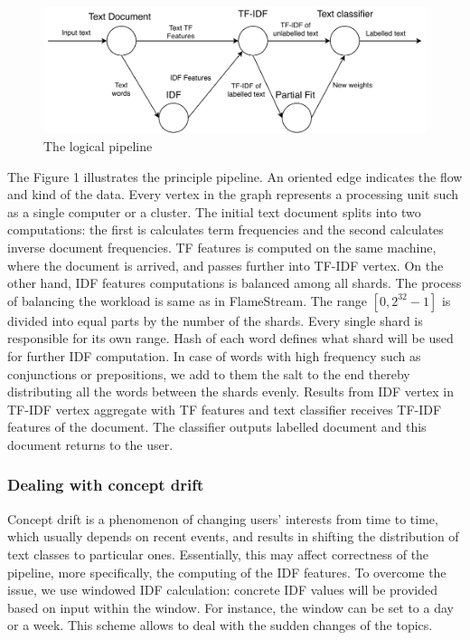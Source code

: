 \begin{figure}[htbp]
  \centering
  \includegraphics[scale=0.45]{pics/logical-graph}
  \caption{The logical pipeline}
  \label {logical graph}
\end{figure}

The Figure 1 illustrates the principle pipeline. An oriented edge indicates the flow and kind of the data. Every vertex in the graph represents a processing unit such as a single computer or a cluster. The initial text document splits into two computations: the first is calculates term frequencies and the second calculates inverse document frequencies. TF features is computed on the same machine, where the document is arrived, and passes further into TF-IDF vertex. On the other hand, IDF features computations is balanced among all shards. The process of balancing the workload is same as in FlameStream. The range $[0, 2^{32} - 1]$ is divided into equal parts by the number of the shards. Every single shard is responsible for its own range. Hash of each word defines what shard will be used for further IDF computation. In case of words with high frequency such as conjunctions or prepositions, we add to them the salt to the end thereby distributing all the words between the shards evenly. Results from IDF vertex in TF-IDF vertex aggregate with TF features and text classifier receives TF-IDF features of the document. The classifier outputs labelled document and this document returns to the user.

\subsubsection{Dealing with concept drift}

Concept drift is a phenomenon of changing users' interests from time to time, which usually depends on recent events, and results in shifting the distribution of text classes to particular ones. Essentially, this may affect correctness of the pipeline, more specifically, the computing of the IDF features. To overcome the issue, we use windowed IDF calculation: concrete IDF values will be provided based on input within the window. For instance, the window can be set to a day or a week. This scheme allows to deal with the sudden changes of the topics.

